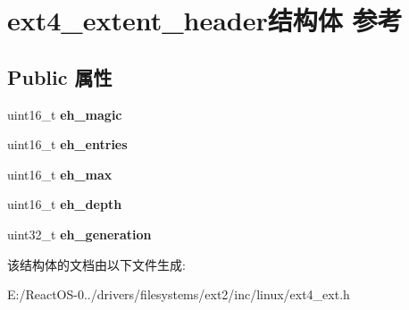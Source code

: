 \hypertarget{structext4__extent__header}{}\section{ext4\+\_\+extent\+\_\+header结构体 参考}
\label{structext4__extent__header}
\subsection*{Public 属性}
\begin{DoxyCompactItemize}
\item 
\mbox{\label{structext4__extent__header_aa42e8374dde671e70f4d093f60795e23}} 
uint16\+\_\+t {\bfseries eh\+\_\+magic}
\item 
\mbox{\label{structext4__extent__header_adc35ce0b9d5cfbd7a87f3ac51bd4e8d6}} 
uint16\+\_\+t {\bfseries eh\+\_\+entries}
\item 
\mbox{\label{structext4__extent__header_a4d977da656fab324e7904ac161fa8527}} 
uint16\+\_\+t {\bfseries eh\+\_\+max}
\item 
\mbox{\label{structext4__extent__header_a480f525d9152c1687261d041c6c13ed0}} 
uint16\+\_\+t {\bfseries eh\+\_\+depth}
\item 
\mbox{\label{structext4__extent__header_a198f4ced1c648132eeb1c1bf47760e32}} 
uint32\+\_\+t {\bfseries eh\+\_\+generation}
\end{DoxyCompactItemize}


该结构体的文档由以下文件生成\+:\begin{DoxyCompactItemize}
\item 
E\+:/\+React\+O\+S-\/0../drivers/filesystems/ext2/inc/linux/ext4\+\_\+ext.\+h\end{DoxyCompactItemize}
